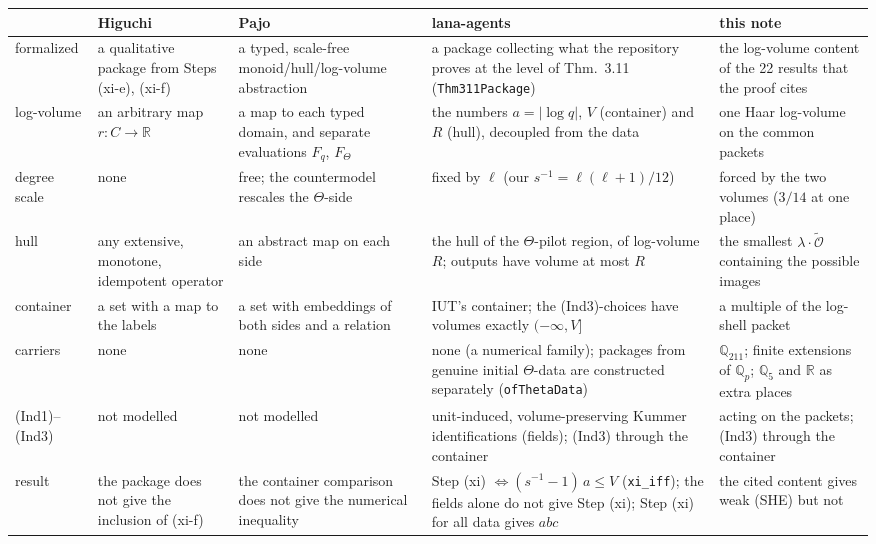 \documentclass[11pt]{article}
\theoremstyle{plain}
\theoremstyle{definition}
\theoremstyle{remark}
\newcommand{\Qp}[1]{\mathbb Q_{#1}}
\newcommand{\tO}{\widetilde{\mathcal O}}
\begin{document}
\begin{table}[!tbp]
\centering\footnotesize
\begin{tabular}{@{}>{\raggedright\arraybackslash}p{}%
>{\raggedright\arraybackslash}p{}%
>{\raggedright\arraybackslash}p{}%
>{\raggedright\arraybackslash}p{}%
>{\raggedright\arraybackslash}p{}@{}}
\toprule
 & Higuchi \cite{Higuchi} & Pajo \cite{Pajo} & lana-agents \cite{lana} & this note\\
\midrule
formalized & a qualitative package from Steps (xi-e), (xi-f) & a typed, scale-free
  monoid/hull/log-volume abstraction & a package collecting what the repository proves at the level of Thm.~3.11 (\texttt{Thm311Package}) & the log-volume content of the 22 results that the
  proof cites\\[2pt]
log-volume & an arbitrary map $r\colon C\to\mathbb R$ & a map to each typed domain, and
  separate evaluations $F_q$, $F_\Theta$ & the numbers $a=|\log q|$, $V$ (container) and $R$ (hull), decoupled from the data & one Haar log-volume on the common packets\\[2pt]
degree scale & none & free; the countermodel rescales the $\Theta$-side & fixed by $\ell$ (our $s^{-1}=\ell(\ell+1)/12$) & forced by the
  two volumes ($3/14$ at one place)\\[2pt]
hull & any extensive, monotone, idempotent operator & an abstract map on each side & the hull of the $\Theta$-pilot region, of log-volume $R$; outputs have volume at most $R$ & the
  smallest $\lambda\cdot\tO$ containing the possible images\\[2pt]
container & a set with a map to the labels & a set with embeddings of both sides and a
  relation & IUT's container; the (Ind3)-choices have volumes exactly $(-\infty,V]$ & a multiple of the log-shell packet\\[2pt]
carriers & none & none & none (a numerical family); packages from genuine initial $\Theta$-data are constructed separately (\texttt{ofThetaData}) & $\Qp{211}$; finite extensions of $\Qp p$; $\Qp5$ and $\mathbb R$ as
  extra places\\[2pt]
(Ind1)--(Ind3) & not modelled & not modelled & unit-induced, volume-preserving Kummer identifications (fields); (Ind3) through the container & acting on the packets; (Ind3) through the
  container\\[2pt]
result & the package does not give the inclusion of (xi-f) & the container comparison
  does not give the numerical inequality & Step (xi) $\iff(s^{-1}-1)\,a\le V$ (\texttt{xi\_iff}); the fields alone do not give Step (xi); Step (xi) for all data gives $abc$ & the cited content gives weak (SHE) but not

\end{tabular}
\end{table}
\end{document}
